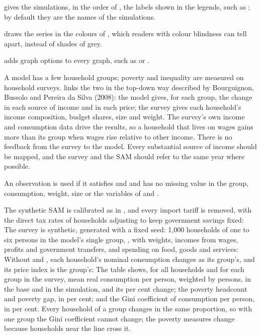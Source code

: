 \begin{optdesc}
\item[\optarg{glab}{els}{labels}] gives the simulations, in the order of
, the labels shown in the legends, such as
; by default they are the
names of the simulations.

\item[\opt{}{gcolor}] draws the series in the colours of \citet{okabe2008},
which readers with colour blindness can tell apart, instead of shades of grey.

\item[\optarg{}{gopts}{options}] adds graph options to every graph, such as
 or .
\end{optdesc}


A model has a few household groups; poverty and inequality are measured on
household surveys. \mbox{} links the two in the top-down way
described by Bourguignon, Bussolo and Pereira da Silva (2008): the
model gives, for each group, the change in each source of income and in each
price; the survey gives each household's income composition, budget shares,
size and weight. The survey's own income and consumption data drive the
results, so a household that lives on wages gains more than its group when
wages rise relative to other income. There is no feedback from the survey to
the model. Every substantial source of income should be mapped, and the
survey and the SAM should refer to the same year where possible.

An observation is used if it satisfies  and  and has no
missing value in the group, consumption, weight, size or the variables of
 and .


The synthetic SAM is calibrated as in , and every import
tariff is removed, with the direct tax rates of households adjusting to keep
government savings fixed:
The survey is synthetic, generated with a fixed seed: 1,000 households of one
to six persons in the model's single group, , with weights, incomes
from wages, profits and government transfers, and spending on food, goods
and services:
Without  and , each household's nominal
consumption changes as its group's, and its price index is the group's:
The table shows, for all households and for each group in the survey, mean
real consumption per person, weighted by persons, in the base and in the
simulation, and its per cent change; the poverty headcount and poverty gap,
in per cent; and the Gini coefficient of consumption per person, in per cent.
Every household of a group changes in the same proportion, so with one group
the Gini coefficient cannot change; the poverty measures change because
households near the line cross it.

